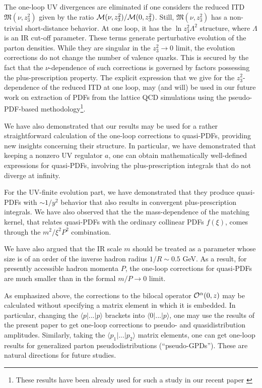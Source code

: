 \documentclass[final,5p,times,twocolumn]{elsarticle}
\begin{document}
The one-loop UV divergences are  eliminated if 
one considers the reduced ITD ${\mathfrak M} (\nu, z_3^2)$  given 
by the ratio ${\cal M} (\nu, z_3^2)/{\cal M} (0, z_3^2)$. 
Still, ${\mathfrak M} (\nu, z_3^2)$  has a non-trivial short-distance 
behavior. At one loop,  it has the  $\ln z_3^2  \Lambda^2$ structure,
where $\Lambda$ is an IR cut-off parameter. 
These terms generate  perturbative evolution of the parton densities.
 While they are 
 singular in the $z_3^2 \to 0$ limit, the evolution 
 corrections do 
 not change the  number of  valence quarks.
 This is secured by the fact that the $\nu$-dependence 
 of such corrections is governed by factors possessing 
 the plus-prescription property.
The explicit expression that  we give for the $z_3^2$-dependence 
of the reduced ITD at one loop, may (and will)  be used 
in our future work on extraction  of  PDFs from the lattice QCD  simulations
using the pseudo-PDF-based methodology\footnote{These results have been already
used for such a study  in our recent paper \cite{Radyushkin:2018cvn}}. 

We have also demonstrated that our results 
may be used for a   rather   straightforward calculation  
of the 
one-loop corrections to  quasi-PDFs, 
providing new insights concerning   their structure.
In particular, we have demonstrated  that keeping a nonzero %
UV regulator $a$, one can obtain mathematically well-defined %
expressions for quasi-PDFs, involving the plus-prescription integrals  %
that do not diverge at infinity.  %

For the UV-finite evolution part, we have demonstrated  that %
they produce quasi-PDFs with $\sim 1/y^2$  behavior that  %
also results in convergent plus-prescription integrals. %
We have also observed  that the the mass-dependence of the matching kernel, that  relates  %
quasi-PDFs with the ordinary collinear PDFs $f(\xi)$, comes through the $m^2/\xi^2P^2$ combination. %

We have also argued that the IR scale $m$ should be treated as a parameter %
whose size is of an order of the inverse hadron radius $1/R\sim 0.5$ GeV.  %
As a result, for presently accessible hadron momenta $P$,  %
the one-loop corrections for quasi-PDFs are  much smaller than in the formal $m/P \to 0$ limit. %

As emphasized above,  the corrections to the bilocal 
operator ${\cal O}^\alpha (0,z)$ may be calculated 
 without specifying a matrix element
in which it is embedded.  In particular, changing the  $\langle p| ...|p\rangle$
brackets into $\langle 0| ...|p\rangle$, one may use the results of the present paper
to get  one-loop corrections to pseudo- and quasidistribution amplitudes.
Similarly, taking the $\langle p_1| ...|p_2\rangle$  matrix elements, 
one can get one-loop  results for generalized parton pseudodistributions
(``pseudo-GPDs''). These are natural directions for  future studies.
\end{document}
